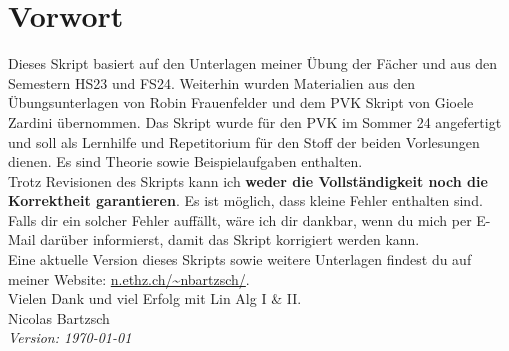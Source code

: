 \setcounter{section}{-1}
\section{Vorwort}
Dieses Skript basiert auf den Unterlagen meiner Übung der Fächer  und  aus den Semestern HS23 und FS24. Weiterhin wurden Materialien aus den Übungsunterlagen von Robin Frauenfelder und dem PVK Skript von Gioele Zardini übernommen. Das Skript wurde für den PVK im Sommer 24 angefertigt und soll als Lernhilfe und Repetitorium für den Stoff der beiden Vorlesungen dienen. Es sind Theorie sowie Beispielaufgaben enthalten.\\


\noindent Trotz Revisionen des Skripts kann ich \textbf{weder die Vollständigkeit noch die Korrektheit garantieren}. Es ist möglich, dass kleine Fehler enthalten sind. Falls dir ein solcher Fehler auffällt, wäre ich dir dankbar, wenn du mich per E-Mail darüber informierst, damit das Skript korrigiert werden kann.\\

\noindent Eine aktuelle Version dieses Skripts sowie weitere Unterlagen findest du auf meiner Website: \url{n.ethz.ch/~nbartzsch/}.\\

\noindent Vielen Dank und viel Erfolg mit Lin Alg I \& II.\\

\noindent Nicolas Bartzsch \\

\noindent \textit{Version: \today}